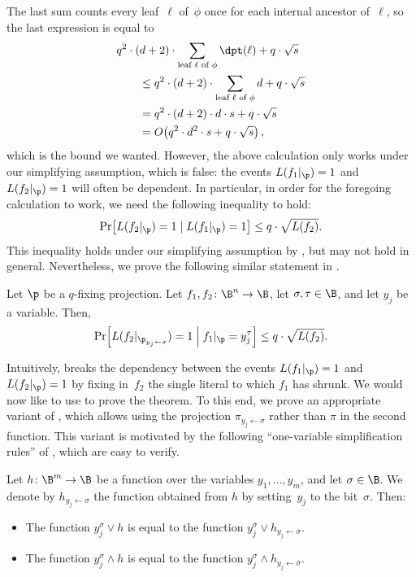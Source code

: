 \documentclass{toc}
\begin{document}
The last sum counts every leaf~$\ell$ of~$\phi$ once for each
internal ancestor of~$\ell$, so the last expression is equal to
\begin{align*}
 & q^{2}\cdot(d+2)\cdot\sum_{\text{leaf \ensuremath{\ell} of \ensuremath{\phi}}}\dpt(\ell)+q\cdot\sqrt{s}\\
 & \qquad\le q^{2}\cdot(d+2)\cdot\sum_{\text{leaf \ensuremath{\ell} of \ensuremath{\phi}}}d+q\cdot\sqrt{s}\\
 & \qquad=q^{2}\cdot(d+2)\cdot d\cdot s+q\cdot\sqrt{s}\\
 & \qquad=O\!\left(q^{2}\cdot d^{2}\cdot s+q\cdot\sqrt{s}\right),
\end{align*}
which is the bound we wanted. However, the above calculation only
works under our simplifying assumption, which is false: the events
$L(f_{1}|_{\p})=1$ and $L(f_{2}|_{\p})=1$ will often be dependent.
In particular, in order for the foregoing calculation to work, we
need the following inequality to hold: 
\[
\Pr\!\left[L(f_{2}|_{\p})=1\mid L(f_{1}|_{\p})=1\right]\le q\cdot\sqrt{L(f_{2})}.
\]
This inequality holds under our simplifying assumption by ,
but may not hold in general. Nevertheless, we prove the following
similar statement in . 
\begin{lemma}
\label{lemma:shrinkage-with-conditioning}Let $\p$ be a $q$-fixing projection.
Let $f_{1},f_{2}\colon\B^{n}\to\B$, let $\sigma,\tau\in\B$, and
let $y_{j}$ be a variable. Then, 
\[
\Pr\!\left[L(f_{2}|_{\p_{y_{j}\gets\sigma}})=1\;\middle|\;f_{1}|_{\p}=y_{j}^{\tau}\right]\le q\cdot\sqrt{L(f_{2})}.
\]
\end{lemma}

Intuitively,  breaks the dependency
between the events $L(f_{1}|_{\p})=1$ and $L(f_{2}|_{\p})=1$ by
fixing in~$f_{2}$ the single literal to which $f_{1}$ has shrunk.
We would now like to use  to prove
the theorem. To this end, we prove an appropriate variant of ,
which allows using the projection $\pi_{y_{j}\gets\sigma}$ rather
than $\pi$ in the second function. This variant is motivated by the
following ``one-variable simplification rules'' of \cite{H98},
which are easy to verify. 
\begin{fact}
\label{fact:simplification-rules}Let $h\colon\B^{m}\to\B$ be a function
over the variables $y_{1},\ldots,y_{m}$, and let $\sigma\in\B$.
We denote by $h_{y_{j}\gets\sigma}$ the function obtained from $h$
by setting~$y_{j}$ to the bit~$\sigma$. Then: 
\begin{itemize}
\item The function $y_{j}^{\sigma}\vee h$ is equal to the function $y_{j}^{\sigma}\vee h_{y_{j}\gets\sigma}$. 
\item The function $y_{j}^{\sigma}\wedge h$ is equal to the function $y_{j}^{\sigma}\wedge h_{y_{j}\gets\overline{\sigma}}$. 
\end{itemize}
\end{fact}
\end{document}
